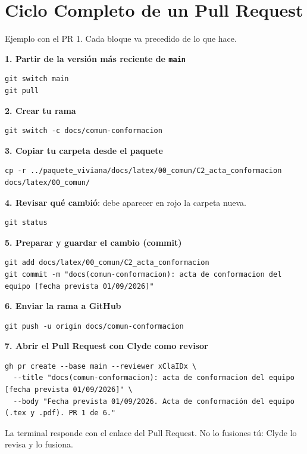 \documentclass[11pt,a4paper]{article}
\begin{document}
\section{Ciclo Completo de un Pull Request}
Ejemplo con el PR 1. Cada bloque va precedido de lo que hace.

\vspace{0.1cm}
\noindent\textbf{1. Partir de la versión más reciente de \texttt{main}}
\begin{lstlisting}
git switch main
git pull
\end{lstlisting}

\noindent\textbf{2. Crear tu rama}
\begin{lstlisting}
git switch -c docs/comun-conformacion
\end{lstlisting}

\noindent\textbf{3. Copiar tu carpeta desde el paquete}
\begin{lstlisting}
cp -r ../paquete_viviana/docs/latex/00_comun/C2_acta_conformacion docs/latex/00_comun/
\end{lstlisting}

\noindent\textbf{4. Revisar qué cambió}: debe aparecer en rojo la carpeta nueva.
\begin{lstlisting}
git status
\end{lstlisting}

\noindent\textbf{5. Preparar y guardar el cambio (commit)}
\begin{lstlisting}
git add docs/latex/00_comun/C2_acta_conformacion
git commit -m "docs(comun-conformacion): acta de conformacion del equipo [fecha prevista 01/09/2026]"
\end{lstlisting}

\noindent\textbf{6. Enviar la rama a GitHub}
\begin{lstlisting}
git push -u origin docs/comun-conformacion
\end{lstlisting}

\noindent\textbf{7. Abrir el Pull Request con Clyde como revisor}
\begin{lstlisting}
gh pr create --base main --reviewer xClaIDx \
  --title "docs(comun-conformacion): acta de conformacion del equipo [fecha prevista 01/09/2026]" \
  --body "Fecha prevista 01/09/2026. Acta de conformación del equipo (.tex y .pdf). PR 1 de 6."
\end{lstlisting}

\noindent La terminal responde con el enlace del Pull Request. No lo fusiones tú: Clyde lo revisa y lo fusiona.
\end{document}
